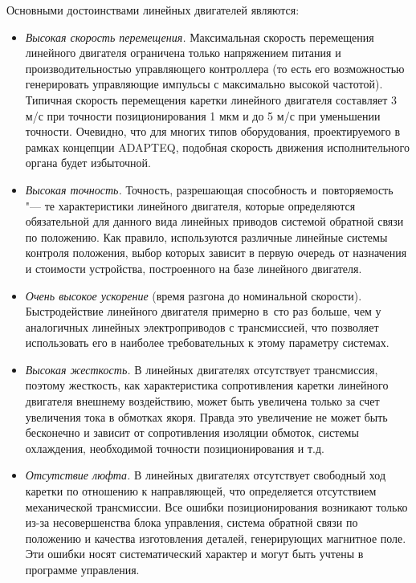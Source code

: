 Основными достоинствами линейных двигателей являются:

\begin{itemize}
	\item \textit{Высокая скорость перемещения.} Максимальная скорость перемещения линейного двигателя ограничена только напряжением питания и производительностью управляющего контроллера (то есть его возможностью генерировать управляющие импульсы с максимально высокой частотой). Типичная скорость перемещения каретки линейного двигателя составляет 3 м/с при точности позиционирования 1 мкм и до 5 м/с при уменьшении точности. Очевидно, что для многих типов оборудования, проектируемого в рамках концепции ADAPTEQ, подобная скорость движения исполнительного органа будет избыточной.
	
	\item \textit{Высокая точность.} Точность, разрешающая способность и~повторяемость "--- те характеристики линейного двигателя, которые определяются обязательной для данного вида линейных приводов системой обратной связи по положению. Как правило, используются различные линейные системы контроля положения, выбор которых зависит в первую очередь от назначения и стоимости устройства, построенного на базе линейного двигателя.
	
	\item \textit{Очень высокое ускорение} (время разгона до номинальной скорости). Быстродействие линейного двигателя примерно в~сто раз больше, чем у аналогичных линейных электроприводов с трансмиссией, что позволяет использовать его в наиболее требовательных к этому параметру системах.
	
	\item \textit{Высокая жесткость.} В линейных двигателях отсутствует трансмиссия, поэтому жесткость, как характеристика сопротивления каретки линейного двигателя внешнему воздействию, может быть увеличена только за счет увеличения тока в обмотках якоря. Правда это увеличение не может быть бесконечно и зависит от сопротивления изоляции обмоток, системы охлаждения, необходимой точности позиционирования и т.\:д.
	
	\item \textit{Отсутствие люфта.} В линейных двигателях отсутствует свободный ход каретки по отношению к направляющей, что определяется отсутствием механической трансмиссии. Все ошибки позиционирования возникают только из-за несовершенства блока управления, система обратной связи по положению и качества изготовления деталей, генерирующих магнитное поле. Эти ошибки носят систематический характер и могут быть учтены в программе управления. 
\end{itemize}

